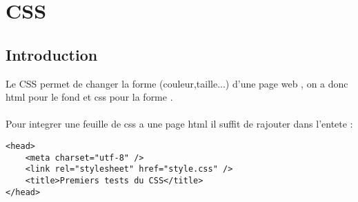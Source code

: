 \documentclass[a4paper,12pt]{book}
\begin{document}


\chapter{CSS}

\section{Introduction}

Le CSS permet de changer la forme (couleur,taille...) d'une page web , on a donc html pour le fond et css pour la forme .\\
\\Pour integrer une feuille de css a une page html il suffit de rajouter dans l'entete :\\
\begin{DDbox}{\linewidth}
\begin{lstlisting}
<head>
	<meta charset="utf-8" />
	<link rel="stylesheet" href="style.css" />
	<title>Premiers tests du CSS</title>
</head>
\end{lstlisting}
\end{DDbox}{\linewidth}
\\
\end{document}
